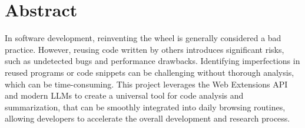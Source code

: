 \section*{Abstract}

In software development, reinventing the wheel is generally considered a bad
practice. However, reusing code written by others introduces significant risks,
such as undetected bugs and performance drawbacks. Identifying imperfections in
reused programs or code snippets can be challenging without thorough analysis,
which can be time-consuming. This project leverages the Web Extensions API
\autocite{CFD} and modern LLMs to create a universal tool for code analysis and
summarization, that can be smoothly integrated into daily browsing routines,
allowing developers to accelerate the overall development and research process.
